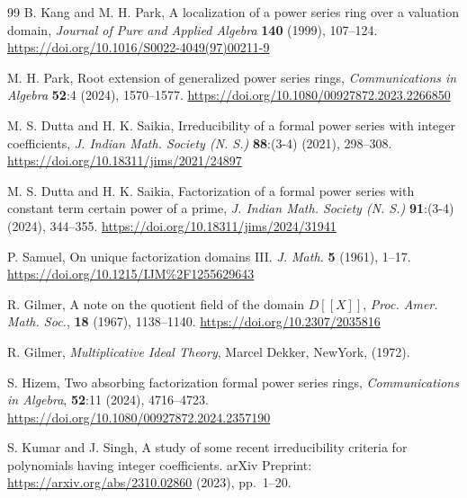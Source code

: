 \documentclass[12pt,reqno]{amsart}%
\begin{document}
\begin{thebibliography}{99}
 B. Kang and M. H. Park, {{A localization of a power series ring over a valuation domain}}, \emph{Journal of Pure and Applied Algebra} {\textbf{140}} (1999), 107--124. \url{https://doi.org/10.1016/S0022-4049(97)00211-9}

 {M. H. Park}, {{Root extension of generalized power series rings}},
\emph{Communications in Algebra}  \textbf{52}:4 (2024), {1570--1577}. \url{https://doi.org/10.1080/00927872.2023.2266850}


 M. S. Dutta and H. K. Saikia, {{Irreducibility  of a formal power series with integer coefficients}}, \emph{J. Indian Math. Society (N. S.)} {\textbf{88}:(3-4)}  (2021), 298--308. \url{https://doi.org/10.18311/jims/2021/24897}%

 M. S. Dutta and H. K. Saikia, {{Factorization of a formal power series with constant term certain power of a prime}}, \emph{J. Indian Math. Society (N. S.)} {\textbf{91}:(3-4)}  (2024), 344--355. \url{https://doi.org/10.18311/jims/2024/31941}%

 P. Samuel, On unique factorization domains III. \emph{J. Math.}  \textbf{5} (1961), 1--17. \url{https://doi.org/10.1215/IJM%2F1255629643}

 R. Gilmer, {{A note on the quotient field of the domain $D[[X]]$}}, \emph{Proc. Amer. Math. Soc.}, {\textbf{18}} (1967), 1138--1140. \url{https://doi.org/10.2307/2035816}

 R. Gilmer, \emph{{Multiplicative Ideal Theory}}, {Marcel Dekker, NewYork}, (1972).

 {S. Hizem}, {{Two absorbing factorization formal power series rings}},
\emph{Communications in Algebra}, \textbf{52}:{11} (2024), {4716--4723}. \url{https://doi.org/10.1080/00927872.2024.2357190}

 S. Kumar and J. Singh,  A study of some recent irreducibility criteria for polynomials having integer coefficients. arXiv Preprint: \url{https://arxiv.org/abs/2310.02860} (2023), pp.~1--20.

\end{thebibliography}
\end{document}
